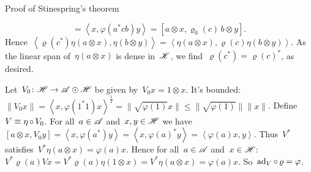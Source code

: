 \documentclass[b]{subfiles}
\begin{document}
\begin{parsec}
\begin{point}
\begin{point}{%
    Proof of Stinespring's theorem }
\begin{point}
\begin{equation*}
        = \left<x, \varphi(a^*cb) y \right>
        = [a\otimes x,\varrho_0(c)\, b \otimes y].
    \end{equation*}
Hence~$
    \left<\varrho(c^*) \eta(a\otimes x), \eta(b\otimes y)\right>=
    \left< \eta(a\otimes x), \varrho(c)\eta(b\otimes y)\right>$.
    As the linear span of~$\eta(a\otimes x)$ is dense in~$\mathscr{K}$,
        we find~$\varrho(c^*) = \varrho(c)^*$, as desired.
\end{point}
\begin{point}%
    Let~$V_0 \colon \mathscr{H} \to \mathscr{A} \odot \mathscr{H}$
        be given by~$V_0 x = 1 \otimes x$.
        It's bounded: $\| V_0 x\| = \left<x, \varphi(1^*1) x\right>^{\frac{1}{2}}
        = \|\sqrt{\varphi(1)} x\| \leq \|\sqrt{\varphi(1)}\| \|x\|$.
    Define~$V \equiv \eta \mathop{\circ} V_0$.
    For all~$a \in \mathscr{A}$ and~$x,y \in \mathscr{H}$ we have
            $[a \otimes x, V_0 y]
            = \left<x, \varphi(a^*)y\right>
            = \left<x, \varphi(a)^*y\right>
            = \left<\varphi(a) x, y\right>$.
    Thus~$V^*$ satisfies~$V^* \eta(a \otimes x) = \varphi(a)x$.
    Hence for all~$a \in \mathscr{A}$ and~$x \in \mathscr{H}$:
    $V^* \varrho(a) V x = V^* \varrho(a) \eta(1 \otimes x)
        = V^* \eta(a\otimes x)
        = \varphi(a)x$.
        So~$\mathrm{ad}_V \mathop{\circ} \varrho = \varphi$.


\end{point}
\end{point}
\end{point}
\end{parsec}
\end{document}
